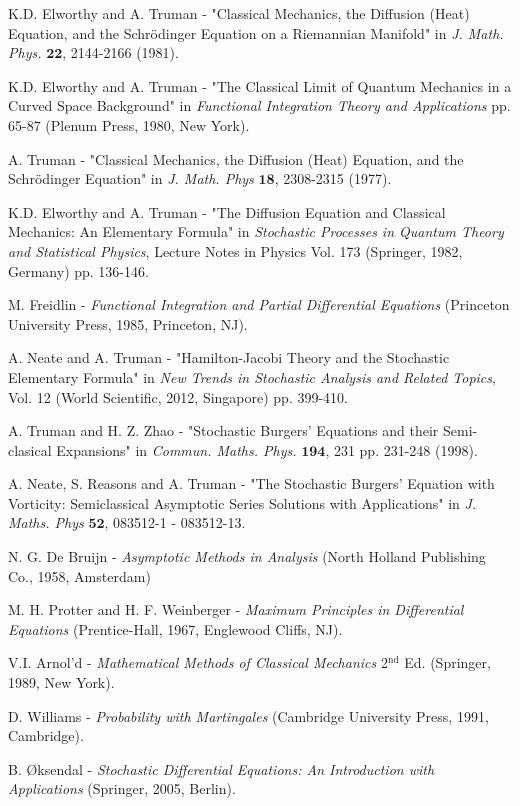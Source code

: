 \documentclass[a4paper,12pt,draft]{report}
\begin{document}
\begin{thebibliography}{99}

 K.D. Elworthy and A. Truman - "Classical Mechanics, the Diffusion (Heat) Equation, and the Schr\"{o}dinger Equation on a Riemannian Manifold" in \emph{J. Math. Phys.} $\mathbf{22}$, 2144-2166 (1981).

 K.D. Elworthy and A. Truman - "The Classical Limit of Quantum Mechanics in a Curved Space Background" in \emph{Functional Integration Theory and Applications} pp. 65-87 (Plenum Press, 1980, New York).

 A. Truman - "Classical Mechanics, the Diffusion (Heat) Equation, and the Schr\"{o}dinger Equation" in \emph{J. Math. Phys} $\mathbf{18}$, 2308-2315 (1977).

 K.D. Elworthy and A. Truman - "The Diffusion Equation and Classical Mechanics: An Elementary Formula" in \emph{Stochastic Processes in Quantum Theory and Statistical Physics}, Lecture Notes in Physics Vol. 173 (Springer, 1982, Germany) pp. 136-146.

 M. Freidlin - \emph{Functional Integration and Partial Differential Equations} (Princeton University Press, 1985, Princeton, NJ).

 A. Neate and A. Truman - "Hamilton-Jacobi Theory and the Stochastic Elementary Formula" in \emph{New Trends in Stochastic Analysis and Related Topics}, Vol. 12 (World Scientific, 2012, Singapore) pp. 399-410.

 A. Truman and H. Z. Zhao - "Stochastic Burgers' Equations and their Semi-clasical Expansions" in \emph{Commun. Maths. Phys.} $\mathbf{194}$, 231 pp. 231-248 (1998).

 A. Neate, S. Reasons and A. Truman - "The Stochastic Burgers' Equation with Vorticity: Semiclassical Asymptotic Series Solutions with Applications" in \emph{J. Maths. Phys} $\mathbf{52}$, 083512-1 - 083512-13.

 N. G. De Bruijn - \emph{Asymptotic Methods in Analysis} (North Holland Publishing Co., 1958, Amsterdam)

 M. H. Protter and H. F. Weinberger - \emph{Maximum Principles in Differential Equations} (Prentice-Hall, 1967, Englewood Cliffs, NJ).

 V.I. Arnol'd - \emph{Mathematical Methods of Classical Mechanics} 2$^{\text{nd}}$ Ed. (Springer, 1989, New York).

 D. Williams - \emph{Probability with Martingales} (Cambridge University Press, 1991, Cambridge).

 B. \O ksendal - \emph{Stochastic Differential Equations: An Introduction with Applications} (Springer, 2005, Berlin).

\end{thebibliography}
\end{document}
